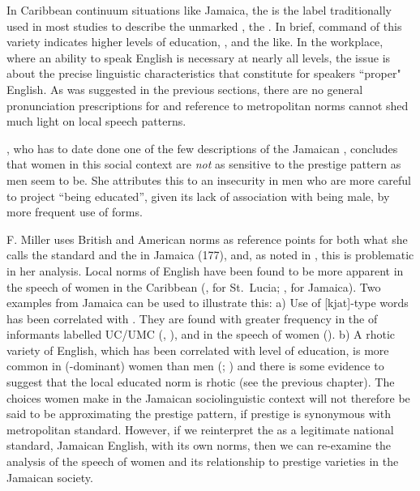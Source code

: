     In Caribbean continuum situations like Jamaica, the  is the label traditionally used in most studies to describe the unmarked , the .  In brief, command of this variety indicates higher levels of education, , and the like.  In the workplace, where an ability to speak English is necessary at nearly all levels, the issue is about the precise linguistic characteristics that constitute for speakers ``proper" English.  As was suggested in the previous sections, there are no general pronunciation prescriptions for  and reference to metropolitan norms cannot shed much light on local speech patterns.     

\citet[112]{Miller1987}, who has to date done one of the few descriptions of the Jamaican , concludes that women in this social context are \textit{not} as sensitive to the prestige pattern as men seem to be.  She attributes this to an insecurity in men who are more careful to project “being educated”, given its lack of association with being male, by more frequent use of  forms.

F. Miller uses British and American norms as reference points for both what she calls the standard and the  in Jamaica (177), and, as noted in , this is problematic in her analysis.  Local norms of English have been found to be more apparent in the speech of women in the Caribbean (\citealt{LePageTabouret1985}, for St.\ Lucia; \citealt{Miller1987}, \citealt{Irvine1994} for Jamaica).  Two examples from Jamaica can be used to illustrate this: a) Use of [kjat]-type words has been correlated with .  They are found with greater frequency in the  of informants labelled UC\slash UMC (\citealt{Miller1987}, \citealt{Irvine1994}), and in the speech of women (\citealt{Irvine1994}).  b) A rhotic variety of English, which has been correlated with level of education, is more common in (-dominant) women than men (\citealt[184]{Beckford-Wassink1999a}; \citealt[72]{Irvine1994}) and there is some evidence to suggest that the local educated norm is rhotic (see the previous chapter).  The choices women make in the Jamaican sociolinguistic context will not therefore be said to be approximating the prestige pattern, if prestige is synonymous with metropolitan standard.  However, if we reinterpret the  as a legitimate national standard, Jamaican English, with its own norms, then we can re-examine the analysis of the speech of women and its relationship to prestige varieties in the Jamaican society.  

